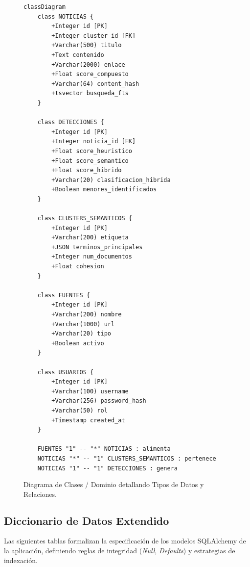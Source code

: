\begin{figure}[htbp]
    \centering
\begin{verbatim}
classDiagram
    class NOTICIAS {
        +Integer id [PK]
        +Integer cluster_id [FK]
        +Varchar(500) titulo
        +Text contenido
        +Varchar(2000) enlace
        +Float score_compuesto
        +Varchar(64) content_hash
        +tsvector busqueda_fts
    }

    class DETECCIONES {
        +Integer id [PK]
        +Integer noticia_id [FK]
        +Float score_heuristico
        +Float score_semantico
        +Float score_hibrido
        +Varchar(20) clasificacion_hibrida
        +Boolean menores_identificados
    }

    class CLUSTERS_SEMANTICOS {
        +Integer id [PK]
        +Varchar(200) etiqueta
        +JSON terminos_principales
        +Integer num_documentos
        +Float cohesion
    }

    class FUENTES {
        +Integer id [PK]
        +Varchar(200) nombre
        +Varchar(1000) url
        +Varchar(20) tipo
        +Boolean activo
    }

    class USUARIOS {
        +Integer id [PK]
        +Varchar(100) username
        +Varchar(256) password_hash
        +Varchar(50) rol
        +Timestamp created_at
    }

    FUENTES "1" -- "*" NOTICIAS : alimenta
    NOTICIAS "*" -- "1" CLUSTERS_SEMANTICOS : pertenece
    NOTICIAS "1" -- "1" DETECCIONES : genera
\end{verbatim}
    \caption{Diagrama de Clases / Dominio detallando Tipos de Datos y Relaciones.}
    \label{fig:domain_diagram}
\end{figure}

\subsection{Diccionario de Datos Extendido}

Las siguientes tablas formalizan la especificación de los modelos SQLAlchemy de la aplicación, definiendo reglas de integridad (\textit{Null}, \textit{Defaults}) y estrategias de indexación.

